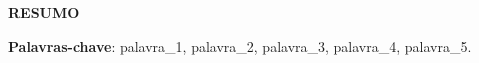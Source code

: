 
\begin{center}
  \textbf{RESUMO}  
\end{center}

\noindent
\lipsum[10][1-100]

\vspace{1\baselineskip}
\noindent
\textbf{Palavras-chave}: palavra\_1, palavra\_2, palavra\_3, palavra\_4, palavra\_5.
\pagebreak
